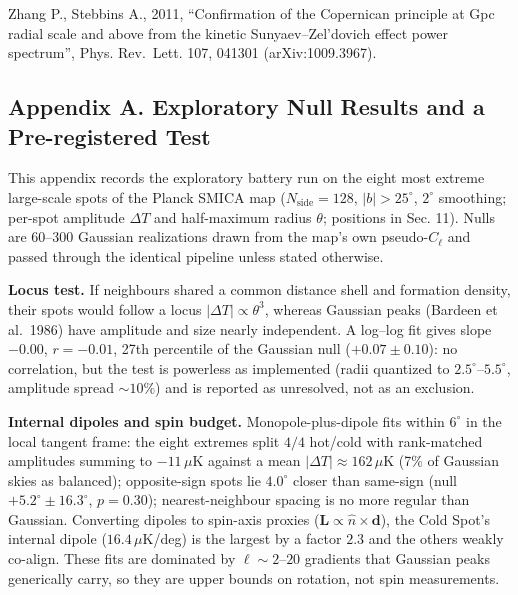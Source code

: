 \documentclass[
  11pt,
]{article}
\begin{document}
Zhang P., Stebbins A., 2011, ``Confirmation of the Copernican principle
at Gpc radial scale and above from the kinetic Sunyaev--Zel'dovich
effect power spectrum'', Phys. Rev.~Lett. 107, 041301 (arXiv:1009.3967).

\hypertarget{appendix-a.-exploratory-null-results-and-a-pre-registered-test}{%
\subsection{\texorpdfstring{\textbf{Appendix A. Exploratory Null Results
and a Pre-registered
Test}}{Appendix A. Exploratory Null Results and a Pre-registered Test}}\label{appendix-a.-exploratory-null-results-and-a-pre-registered-test}}

This appendix records the exploratory battery run on the eight most
extreme large-scale spots of the Planck SMICA map
(\(N_{\text{side}} = 128\), \(|b| > 25^\circ\), \(2^\circ\) smoothing;
per-spot amplitude \(\Delta T\) and half-maximum radius \(\theta\);
positions in Sec. 11). Nulls are 60--300 Gaussian realizations drawn
from the map's own pseudo-\(C_\ell\) and passed through the identical
pipeline unless stated otherwise.

\textbf{Locus test.} If neighbours shared a common distance shell and
formation density, their spots would follow a locus
\(|\Delta T| \propto \theta^3\), whereas Gaussian peaks (Bardeen et
al.~1986) have amplitude and size nearly independent. A log--log fit
gives slope \(-0.00\), \(r = -0.01\), 27th percentile of the Gaussian
null (\(+0.07 \pm 0.10\)): no correlation, but the test is powerless as
implemented (radii quantized to \(2.5^\circ\)--\(5.5^\circ\), amplitude
spread \(\sim\!10\%\)) and is reported as unresolved, not as an
exclusion.

\textbf{Internal dipoles and spin budget.} Monopole-plus-dipole fits
within \(6^\circ\) in the local tangent frame: the eight extremes split
\(4/4\) hot/cold with rank-matched amplitudes summing to \(-11\,\mu\)K
against a mean \(|\Delta T| \approx 162\,\mu\)K (7\% of Gaussian skies
as balanced); opposite-sign spots lie \(4.0^\circ\) closer than
same-sign (null \(+5.2^\circ \pm 16.3^\circ\), \(p = 0.30\));
nearest-neighbour spacing is no more regular than Gaussian. Converting
dipoles to spin-axis proxies
(\(\mathbf{L} \propto \hat{n} \times \mathbf{d}\)), the Cold Spot's
internal dipole (\(16.4\,\mu\)K/deg) is the largest by a factor \(2.3\)
and the others weakly co-align. These fits are dominated by
\(\ell \sim 2\)--\(20\) gradients that Gaussian peaks generically carry,
so they are upper bounds on rotation, not spin measurements.
\end{document}
